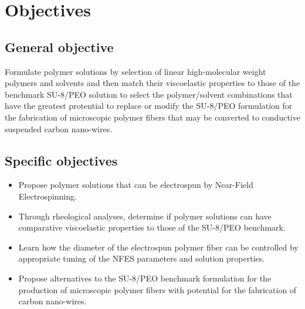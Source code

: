 \section{Objectives}

\subsection{General objective}
Formulate polymer solutions by selection of linear high-molecular weight polymers and solvents and then match their viscoelastic properties to those of the benchmark SU-8/PEO solution to select the polymer/solvent combinations that have the greatest protential to replace or modify the SU-8/PEO formulation for the fabrication of microscopic polymer fibers that may be converted to conductive suspended carbon nano-wires.

\subsection{Specific objectives}

\begin{itemize}
	\item{
	Propose polymer solutions that can be electrospun by Near-Field Electrospinning.
    }
    \item{
    Through rheological analyses, determine if polymer solutions can have comparative viscoelastic properties to those of the SU-8/PEO benchmark.
    }
    \item{
    Learn how the diameter of the electrospun polymer fiber can be controlled by appropriate tuning of the NFES parameters and solution properties. 
    }
    \item{
    Propose alternatives to the SU-8/PEO benchmark formulation for the production of microscopic polymer fibers with potential for the fabrication of carbon nano-wires. 
    }
\end{itemize}

